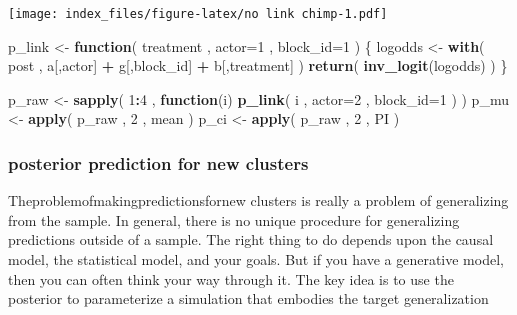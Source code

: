 \documentclass[
]{article}
\newenvironment{Shaded}{\begin{snugshade}}{\end{snugshade}}
\newcommand{\CommentTok}[1]{\textcolor[rgb]{0.56,0.35,0.01}{\textit{#1}}}
\newcommand{\ControlFlowTok}[1]{\textcolor[rgb]{0.13,0.29,0.53}{\textbf{#1}}}
\newcommand{\DataTypeTok}[1]{\textcolor[rgb]{0.13,0.29,0.53}{#1}}
\newcommand{\DecValTok}[1]{\textcolor[rgb]{0.00,0.00,0.81}{#1}}
\newcommand{\KeywordTok}[1]{\textcolor[rgb]{0.13,0.29,0.53}{\textbf{#1}}}
\newcommand{\NormalTok}[1]{#1}
\newcommand{\OperatorTok}[1]{\textcolor[rgb]{0.81,0.36,0.00}{\textbf{#1}}}
\newcommand{\StringTok}[1]{\textcolor[rgb]{0.31,0.60,0.02}{#1}}
\begin{document}
\begin{Shaded}
\end{Shaded}

\texttt{[image: index\_files/figure-latex/no link chimp-1.pdf]}

\begin{Shaded}
\begin{Highlighting}[]
\NormalTok{ p_link <-}\StringTok{ }\ControlFlowTok{function}\NormalTok{( treatment , }\DataTypeTok{actor=}\DecValTok{1}\NormalTok{ , }\DataTypeTok{block_id=}\DecValTok{1}\NormalTok{ ) \{ }
\NormalTok{   logodds <-}\StringTok{ }\KeywordTok{with}\NormalTok{( post ,}
\NormalTok{a[,actor] }\OperatorTok{+}\StringTok{ }\NormalTok{g[,block_id] }\OperatorTok{+}\StringTok{ }\NormalTok{b[,treatment] ) }
   \KeywordTok{return}\NormalTok{( }\KeywordTok{inv_logit}\NormalTok{(logodds) )}
\NormalTok{ \}}
 
\NormalTok{p_raw <-}\StringTok{ }\KeywordTok{sapply}\NormalTok{( }\DecValTok{1}\OperatorTok{:}\DecValTok{4}\NormalTok{ , }\ControlFlowTok{function}\NormalTok{(i) }\KeywordTok{p_link}\NormalTok{( i , }\DataTypeTok{actor=}\DecValTok{2}\NormalTok{ , }\DataTypeTok{block_id=}\DecValTok{1}\NormalTok{ ) ) }
\NormalTok{p_mu <-}\StringTok{ }\KeywordTok{apply}\NormalTok{( p_raw , }\DecValTok{2}\NormalTok{ , mean )}
\NormalTok{p_ci <-}\StringTok{ }\KeywordTok{apply}\NormalTok{( p_raw , }\DecValTok{2}\NormalTok{ , PI )}
\end{Highlighting}
\end{Shaded}

\hypertarget{posterior-prediction-for-new-clusters}{%
\subsubsection{posterior prediction for new
clusters}\label{posterior-prediction-for-new-clusters}}

Theproblemofmakingpredictionsfornew clusters is really a problem of
generalizing from the sample. In general, there is no unique procedure
for generalizing predictions outside of a sample. The right thing to do
depends upon the causal model, the statistical model, and your goals.
But if you have a generative model, then you can often think your way
through it. The key idea is to use the posterior to parameterize a
simulation that embodies the target generalization
\end{document}
